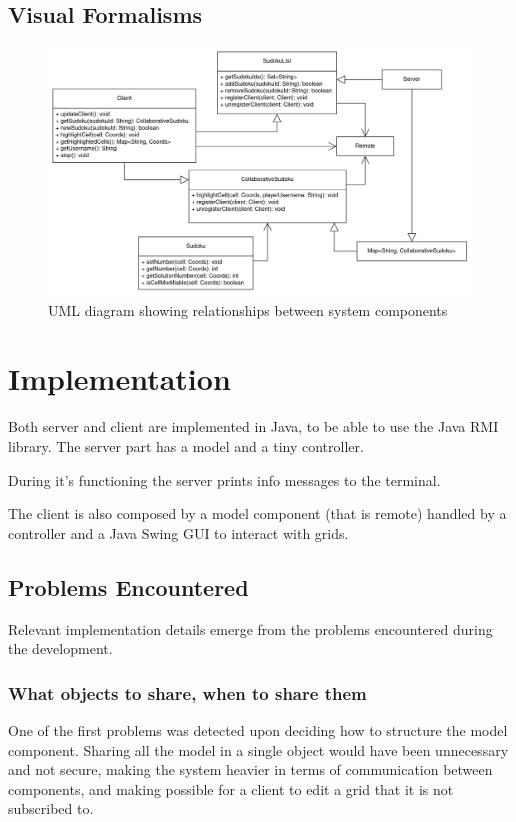 \documentclass[12pt, a4paper]{report}
\begin{document}
\section{Visual Formalisms}
\begin{figure}
    \centering
    \includegraphics[scale=0.25]{class-diagram.png}
    \caption{UML diagram showing relationships between system components}
\end{figure}

\chapter{Implementation}
Both server and client are implemented in Java, to be able to use the Java RMI
 library. The server part has a model and a tiny controller.

During it's functioning the server prints info messages to the terminal.
 
The client is also composed by a model component (that is remote)
 handled by a controller and a Java Swing GUI to interact with grids.

\section{Problems Encountered}
Relevant implementation details emerge from the problems encountered during the
 development.

\subsection{What objects to share, when to share them}
One of the first problems was detected upon deciding how to structure the model
 component. Sharing all the model in a single object would have been unnecessary
 and not secure, making the system heavier in terms of communication between
 components, and making possible for a client to edit a grid that it is not
 subscribed to.
\end{document}
